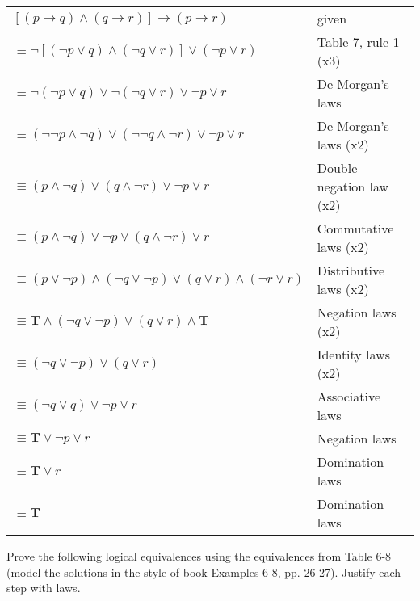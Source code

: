 \documentclass[12pt,addpoints]{exam}
\newenvironment{my_parts}{
\begin{parts}
    \setlength{\itemsep}{1pt}
    \setlength{\parskip}{0pt}
    \setlength{\parsep}{0pt}
}{\end{parts}}
\begin{document}
\begin{questions}
\begin{solution}
    \begin{tabular}{|l|l|}
    \hline
    $[(p \rightarrow q) \wedge (q \rightarrow r)] \rightarrow (p
    \rightarrow r)$ & given \\
    $\equiv \neg[(\neg p \vee q) \wedge (\neg q \vee r)] \vee (\neg p \vee
    r)$ & Table 7, rule 1 (x3)\\
    $\equiv \neg(\neg p \vee q) \vee \neg(\neg q \vee r) \vee \neg p \vee
    r$ & De Morgan's laws \\
    $\equiv (\neg\neg p \wedge \neg q) \vee (\neg\neg q \wedge \neg r) \vee
    \neg p \vee r$ & De Morgan's laws (x2) \\
    $\equiv (p \wedge \neg q) \vee (q \wedge \neg r) \vee \neg p \vee r$ &
    Double negation law (x2)\\
    $\equiv (p \wedge \neg q) \vee \neg p \vee (q \wedge \neg r) \vee r$ &
    Commutative laws (x2)\\
    $\equiv (p \vee \neg p) \wedge (\neg q \vee \neg p) \vee (q \vee r) \wedge
    (\neg r \vee r)$ & Distributive laws (x2)\\
    $\equiv \mathbf{T} \wedge (\neg q \vee \neg p) \vee (q \vee r) \wedge
    \mathbf{T}$ & Negation laws (x2)\\
    $\equiv (\neg q \vee \neg p) \vee (q \vee r)$ & Identity laws (x2)\\
    $\equiv (\neg q \vee q) \vee \neg p \vee r$ & Associative laws \\
    $\equiv \mathbf{T} \vee \neg p \vee r$ & Negation laws \\
    $\equiv \mathbf{T} \vee r$ & Domination laws \\
    $\equiv \mathbf{T}$ & Domination laws \\
    \hline
   \end{tabular}
   \end{solution}

\question Prove the following logical equivalences using the
equivalences from Table 6-8 (model the solutions in the style of
book Examples 6-8, pp. 26-27).  Justify each step with laws.
    \begin{solution}
    \begin{my_parts}

\end{my_parts}
\end{solution}
\end{questions}
\end{document}
